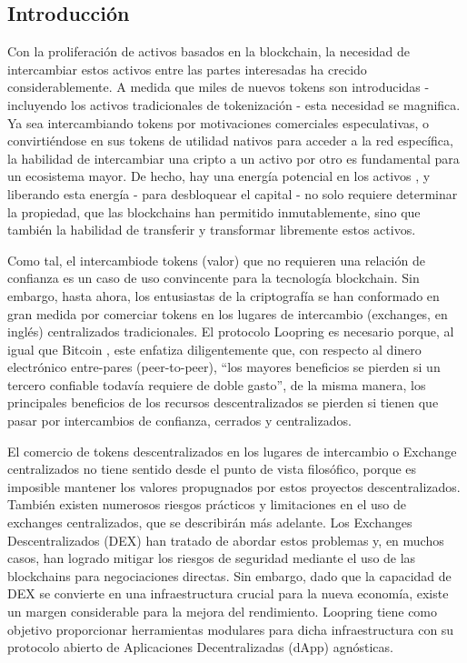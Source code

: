 \documentclass[UTF8,nofonts]{article}
\begin{document}
\begin{multicols}{2}
\section{Introducci\'on\label{sec:introduction}}
Con la proliferaci\'on de activos basados en la blockchain, la necesidad de intercambiar estos activos entre las partes interesadas ha crecido considerablemente.  A medida que miles de nuevos tokens son introducidas - incluyendo los activos tradicionales de tokenizaci\'on - esta necesidad se magnifica. Ya sea intercambiando tokens por motivaciones comerciales especulativas, o convirti\'endose en sus tokens de utilidad nativos para acceder a la red espec\'ifica, la habilidad de intercambiar una cripto a un activo por otro es fundamental para un ecosistema mayor. De hecho, hay una energ\'ia potencial en los activos \cite{desotocapital}, y liberando esta energ\'ia - para desbloquear el capital  - no solo requiere determinar la propiedad, que las blockchains han permitido inmutablemente, sino que tambi\'en la habilidad de transferir y transformar libremente estos activos.

Como tal, el intercambiode tokens (valor) que no requieren una relaci\'on de confianza es un caso de uso convincente para la tecnolog\'ia blockchain. Sin embargo, hasta ahora, los entusiastas de la criptograf\'ia se han conformado en gran medida por comerciar tokens en los lugares de intercambio (exchanges, en ingl\'es) centralizados tradicionales.  El protocolo Loopring es necesario porque, al igual que Bitcoin \cite{nakamoto2008bitcoin}, este enfatiza diligentemente que, con respecto al dinero electr\'onico entre-pares (peer-to-peer), \enquote{los mayores beneficios se pierden si un tercero confiable todav\'ia requiere de doble gasto}, de la misma manera, los principales beneficios de los recursos descentralizados se pierden si tienen que pasar por intercambios de confianza, cerrados y centralizados.

El comercio de tokens descentralizados en los lugares de intercambio o Exchange centralizados no tiene sentido desde el punto de vista filos\'ofico, porque es imposible mantener los valores propugnados por estos proyectos descentralizados. Tambi\'en existen numerosos riesgos pr\'acticos y limitaciones en el uso de exchanges centralizados, que se describir\'an m\'as adelante. Los Exchanges Descentralizados (DEX) \cite{schuh2015bitshares} \cite{bancor} \cite{kyber} han tratado de abordar estos problemas y, en muchos casos, han logrado mitigar los riesgos de seguridad mediante el uso de las blockchains para negociaciones directas. Sin embargo, dado que la capacidad de DEX se convierte en una infraestructura crucial para la nueva econom\'ia, existe un margen considerable para la mejora del rendimiento. Loopring tiene como objetivo proporcionar herramientas modulares para dicha infraestructura con su protocolo abierto de Aplicaciones Decentralizadas (dApp) agn\'osticas.



\end{multicols}
\end{document}
